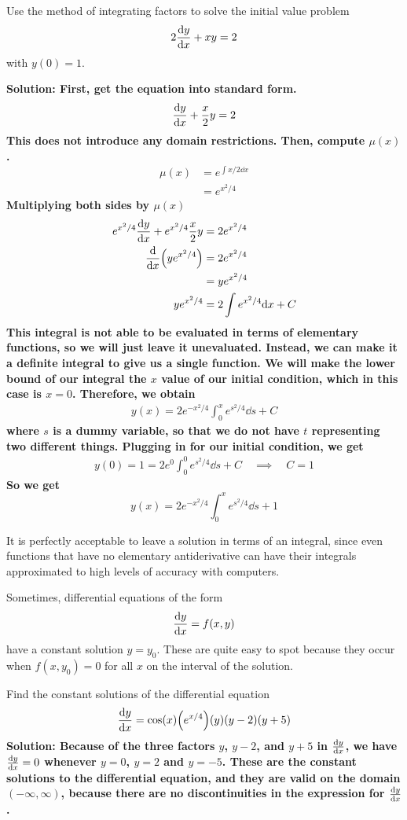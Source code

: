 \begin{example}
    Use the method of integrating factors to solve the initial value problem 
    \[ 2\dv{y}{x} + xy = 2 \]
    with $y(0) = 1$. \par
    \bf{Solution:} First, get the equation into standard form.
    \[ \dv{y}{x} + \frac{x}{2}y = 2\]
    This does not introduce any domain restrictions. Then, compute $\mu(x)$.
    \begin{align*}
        \mu(x) &= e^{\int x/2 \dd x} \\
        &= e^{x^2/4}
    \end{align*}
    Multiplying both sides by $\mu(x)$
    \begin{align*}
        e^{x^2/4}\dv{y}{x} + e^{x^2/4}\frac{x}{2}y &= 2e^{x^2/4} \\
        \dv{x}\pqty{ye^{x^2/4}} &= 2e^{x^2/4} \\
        &= ye^{x^2/4} \\
        ye^{x^2/4} &= 2\int e^{x^2/4}\dd x + C
    \end{align*}
    This integral is not able to be evaluated in terms of elementary functions, so we will just leave it unevaluated. Instead, we can make it a definite integral to give us a single function. We will make the lower bound of our integral the $x$ value of our initial condition, which in this case is $x=0$. Therefore, we obtain
    \begin{align*}
        y(x) = 2e^{-x^2/4}\int_0^x e^{s^2/4}\dd s + C 
    \end{align*}
    where $s$ is a dummy variable, so that we do not have $t$ representing two different things. Plugging in for our initial condition, we get
    \begin{align*}
        y(0) = 1 = 2e^0 \int_0^0 e^{s^2/4}\dd s + C \quad \implies \quad C = 1
    \end{align*}
    So we get
    \[ y(x) = 2e^{-x^2/4}\int_0^x e^{s^2/4}\dd s + 1 \]
\end{example}
It is perfectly acceptable to leave a solution in terms of an integral, since even functions that have no elementary antiderivative can have their integrals approximated to high levels of accuracy with computers. \par
Sometimes, differential equations of the form 
\[ \dv{y}{x} = f(x,y) \]
have a constant solution $y=y_0$. These are quite easy to spot because they occur when $f(x, y_0) = 0$ for all $x$ on the interval of the solution.
\begin{example}
    Find the constant solutions of the differential equation 
    \[ \dv{y}{x} = \cos (x)\pqty{ e^{x/4}}(y)(y-2)(y+5) \]
    \bf{Solution:} Because of the three factors $y$, $y-2$, and $y+5$ in $\dv{y}{x}$, we have $\dv{y}{x}=0$ whenever $y=0$, $y=2$ and $y=-5$. These are the constant solutions to the differential equation, and they are valid on the domain $(-\infty, \infty)$, because there are no discontinuities in the expression for $\dv{y}{x}$.
\end{example} 

